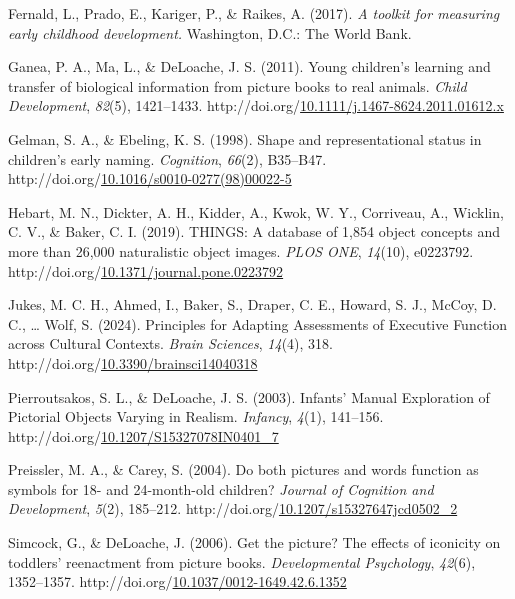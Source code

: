 \documentclass[10pt, letterpaper]{article}
\begin{document}
\begin{CSLReferences}{1}{0}
Fernald, L., Prado, E., Kariger, P., \& Raikes, A. (2017). \emph{A
toolkit for measuring early childhood development.} Washington, D.C.:
The World Bank.

Ganea, P. A., Ma, L., \& DeLoache, J. S. (2011). Young children's
learning and transfer of biological information from picture books to
real animals. \emph{Child Development}, \emph{82}(5), 1421--1433.
http://doi.org/\href{https://doi.org/10.1111/j.1467-8624.2011.01612.x}{10.1111/j.1467-8624.2011.01612.x}

Gelman, S. A., \& Ebeling, K. S. (1998). Shape and representational
status in children's early naming. \emph{Cognition}, \emph{66}(2),
B35--B47.
http://doi.org/\href{https://doi.org/10.1016/s0010-0277(98)00022-5}{10.1016/s0010-0277(98)00022-5}

Hebart, M. N., Dickter, A. H., Kidder, A., Kwok, W. Y., Corriveau, A.,
Wicklin, C. V., \& Baker, C. I. (2019). {THINGS}: {A} database of 1,854
object concepts and more than 26,000 naturalistic object images.
\emph{PLOS ONE}, \emph{14}(10), e0223792.
http://doi.org/\href{https://doi.org/10.1371/journal.pone.0223792}{10.1371/journal.pone.0223792}

Jukes, M. C. H., Ahmed, I., Baker, S., Draper, C. E., Howard, S. J.,
McCoy, D. C., \ldots{} Wolf, S. (2024). Principles for {Adapting}
{Assessments} of {Executive} {Function} across {Cultural} {Contexts}.
\emph{Brain Sciences}, \emph{14}(4), 318.
http://doi.org/\href{https://doi.org/10.3390/brainsci14040318}{10.3390/brainsci14040318}

Pierroutsakos, S. L., \& DeLoache, J. S. (2003). Infants' {Manual}
{Exploration} of {Pictorial} {Objects} {Varying} in {Realism}.
\emph{Infancy}, \emph{4}(1), 141--156.
http://doi.org/\href{https://doi.org/10.1207/S15327078IN0401_7}{10.1207/S15327078IN0401\_7}

Preissler, M. A., \& Carey, S. (2004). Do both pictures and words
function as symbols for 18- and 24-month-old children? \emph{Journal of
Cognition and Development}, \emph{5}(2), 185--212.
http://doi.org/\href{https://doi.org/10.1207/s15327647jcd0502_2}{10.1207/s15327647jcd0502\_2}

Simcock, G., \& DeLoache, J. (2006). Get the picture? {The} effects of
iconicity on toddlers' reenactment from picture books.
\emph{Developmental Psychology}, \emph{42}(6), 1352--1357.
http://doi.org/\href{https://doi.org/10.1037/0012-1649.42.6.1352}{10.1037/0012-1649.42.6.1352}


\end{CSLReferences}
\end{document}
